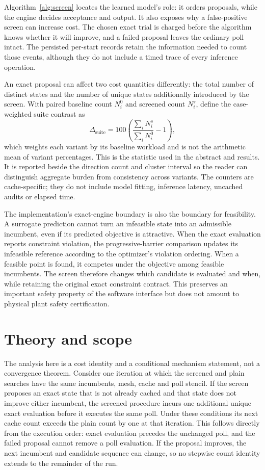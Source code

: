 \documentclass[10pt]{article}
\begin{document}
Algorithm~\ref{alg:screen} locates the learned model's role: it orders proposals, while the engine decides acceptance and output. It also exposes why a false-positive screen can increase cost. The chosen exact trial is charged before the algorithm knows whether it will improve, and a failed proposal leaves the ordinary poll intact. The persisted per-start records retain the information needed to count those events, although they do not include a timed trace of every inference operation.

An exact proposal can affect two cost quantities differently: the total number of distinct states and the number of unique states additionally introduced by the screen. With paired baseline count $N_i^0$ and screened count $N_i^s$, define the case-weighted suite contrast as
\begin{equation}
 \Delta_{\mathrm{suite}}=100\left(\frac{\sum_i N_i^s}{\sum_i N_i^0}-1\right),
\end{equation}
which weights each variant by its baseline workload and is not the arithmetic mean of variant percentages. This is the statistic used in the abstract and results. It is reported beside the direction count and cluster interval so the reader can distinguish aggregate burden from consistency across variants. The counters are cache-specific; they do not include model fitting, inference latency, uncached audits or elapsed time.

The implementation's exact-engine boundary is also the boundary for feasibility. A surrogate prediction cannot turn an infeasible state into an admissible incumbent, even if its predicted objective is attractive. When the exact evaluation reports constraint violation, the progressive-barrier comparison updates its infeasible reference according to the optimizer's violation ordering. When a feasible point is found, it competes under the objective among feasible incumbents. The screen therefore changes which candidate is evaluated and when, while retaining the original exact constraint contract. This preserves an important safety property of the software interface but does not amount to physical plant safety certification.

\section{Theory and scope}
The analysis here is a cost identity and a conditional mechanism statement, not a convergence theorem. Consider one iteration at which the screened and plain searches have the same incumbents, mesh, cache and poll stencil. If the screen proposes an exact state that is not already cached and that state does not improve either incumbent, the screened procedure incurs one additional unique exact evaluation before it executes the same poll. Under these conditions its next cache count exceeds the plain count by one at that iteration. This follows directly from the execution order: exact evaluation precedes the unchanged poll, and the failed proposal cannot remove a poll evaluation. If the proposal improves, the next incumbent and candidate sequence can change, so no stepwise count identity extends to the remainder of the run.
\end{document}
